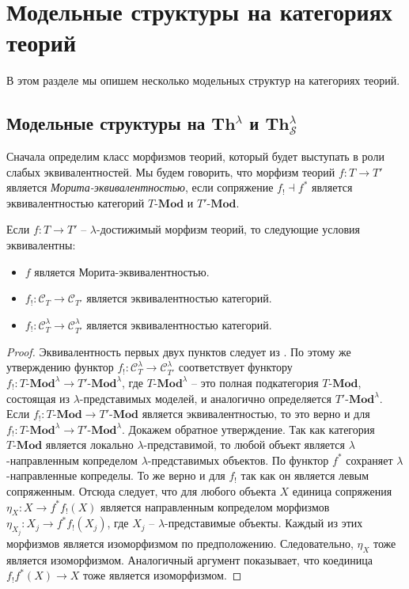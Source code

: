 \documentclass[reqno]{amsart}
\theoremstyle{definition}
\theoremstyle{remark}
\newcommand{\bcat}[1]{\mathbf{#1}}
\newcommand{\cat}[1]{\mathcal{#1}}
\newcommand{\Mod}[1]{#1\text{-}\bcat{Mod}}
\newcommand{\Th}{\bcat{Th}}
\begin{document}
\section{Модельные структуры на категориях теорий}

В этом разделе мы опишем несколько модельных структур на категориях теорий.

\subsection{Модельные структуры на $\Th^\lambda$ и $\Th^\lambda_\mathcal{S}$}

Сначала определим класс морфизмов теорий, который будет выступать в роли слабых эквивалентностей.
Мы будем говорить, что морфизм теорий $f : T \to T'$ является \emph{Морита-эквивалентностью}, если сопряжение $f_! \dashv f^*$ является эквивалентностью категорий $\Mod{T}$ и $\Mod{T'}$.

\begin{prop}
Если $f : T \to T'$ -- $\lambda$-достижимый морфизм теорий, то следующие условия эквивалентны:
\begin{itemize}
\item $f$ является Морита-эквивалентностью.
\item $f_! : \cat{C}_T \to \cat{C}_{T'}$ является эквивалентностью категорий.
\item $f_! : \cat{C}_T^\lambda \to \cat{C}_{T'}^\lambda$ является эквивалентностью категорий.
\end{itemize}
\end{prop}
\begin{proof}
Эквивалентность первых двух пунктов следует из .
По этому же утверждению функтор $f_! : \cat{C}_T^\lambda \to \cat{C}_{T'}^\lambda$ соответствует функтору $f_! : \Mod{T}^\lambda \to \Mod{T'}^\lambda$,
где $\Mod{T}^\lambda$ -- это полная подкатегория $\Mod{T}$, состоящая из $\lambda$-представимых моделей, и аналогично определяется $\Mod{T'}^\lambda$.
Если $f_! : \Mod{T} \to \Mod{T'}$ является эквивалентностью, то это верно и для $f_! : \Mod{T}^\lambda \to \Mod{T'}^\lambda$.
Докажем обратное утверждение.
Так как категория $\Mod{T}$ является локально $\lambda$-представимой, то любой объект является $\lambda$-направленным копределом $\lambda$-представимых объектов.
По  функтор $f^*$ сохраняет $\lambda$-направленные копределы.
То же верно и для $f_!$ так как он является левым сопряженным.
Отсюда следует, что для любого объекта $X$ единица сопряжения $\eta_X : X \to f^* f_!(X)$
является направленным копределом морфизмов $\eta_{X_j} : X_j \to f^* f_! (X_j)$, где $X_j$ -- $\lambda$-представимые объекты.
Каждый из этих морфизмов является изоморфизмом по предположению.
Следовательно, $\eta_X$ тоже является изоморфизмом.
Аналогичный аргумент показывает, что коединица $f_! f^*(X) \to X$ тоже является изоморфизмом.
\end{proof}
\end{document}
